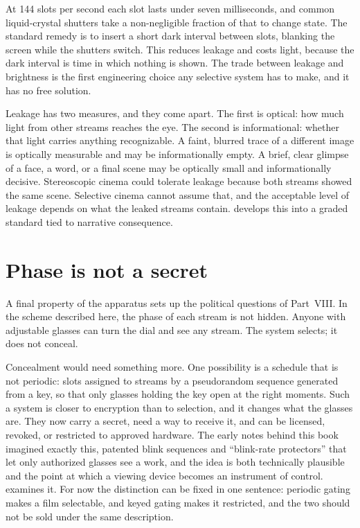 At 144 slots per second each slot lasts under seven milliseconds, and common liquid-crystal shutters take a non-negligible fraction of that to change state. The standard remedy is to insert a short dark interval between slots, blanking the screen while the shutters switch. This reduces leakage and costs light, because the dark interval is time in which nothing is shown. The trade between leakage and brightness is the first engineering choice any selective system has to make, and it has no free solution.

Leakage has two measures, and they come apart. The first is optical: how much light from other streams reaches the eye. The second is informational: whether that light carries anything recognizable. A faint, blurred trace of a different image is optically measurable and may be informationally empty. A brief, clear glimpse of a face, a word, or a final scene may be optically small and informationally decisive. Stereoscopic cinema could tolerate leakage because both streams showed the same scene. Selective cinema cannot assume that, and the acceptable level of leakage depends on what the leaked streams contain.  develops this into a graded standard tied to narrative consequence.

\section{Phase is not a secret}

A final property of the apparatus sets up the political questions of Part~VIII. In the scheme described here, the phase of each stream is not hidden. Anyone with adjustable glasses can turn the dial and see any stream. The system selects; it does not conceal.

Concealment would need something more. One possibility is a schedule that is not periodic: slots assigned to streams by a pseudorandom sequence generated from a key, so that only glasses holding the key open at the right moments. Such a system is closer to encryption than to selection, and it changes what the glasses are. They now carry a secret, need a way to receive it, and can be licensed, revoked, or restricted to approved hardware. The early notes behind this book imagined exactly this, patented blink sequences and ``blink-rate protectors'' that let only authorized glasses see a work, and the idea is both technically plausible and the point at which a viewing device becomes an instrument of control.  examines it. For now the distinction can be fixed in one sentence: periodic gating makes a film selectable, and keyed gating makes it restricted, and the two should not be sold under the same description.
